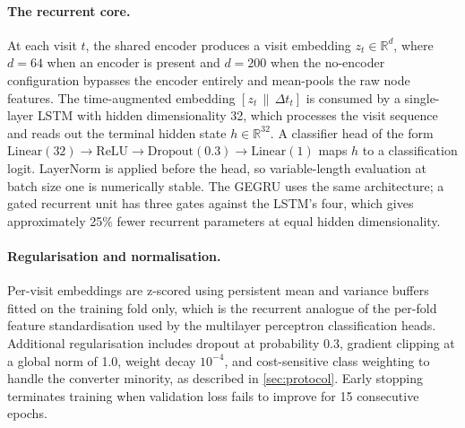 \paragraph{The recurrent core.}
At each visit $t$, the shared encoder produces a visit embedding $z_t \in \mathbb{R}^{d}$,
where $d = 64$ when an encoder is present and $d = 200$ when the no-encoder
configuration bypasses the encoder entirely and mean-pools the raw node features. The time-augmented
embedding $[z_t \,\|\, \Delta t_t]$ is consumed by a single-layer \ac{LSTM} with hidden
dimensionality 32, which processes the visit sequence and reads out the terminal hidden
state $h \in \mathbb{R}^{32}$. A classifier head of the form
$\text{Linear}(32) \to \text{ReLU} \to \text{Dropout}(0.3) \to \text{Linear}(1)$
maps $h$ to a classification logit. LayerNorm is applied before the head, so
variable-length evaluation at batch size one is numerically stable. The \ac{GEGRU} uses the
same architecture; a gated recurrent unit has three gates
against the \ac{LSTM}'s four, which gives approximately 25\% fewer recurrent parameters at
equal hidden dimensionality.

\paragraph{Regularisation and normalisation.}
Per-visit embeddings are z-scored using persistent mean and variance buffers fitted on the
training fold only, which is the recurrent analogue of the per-fold feature
standardisation used by the multilayer perceptron classification heads. Additional
regularisation includes dropout at probability 0.3, gradient clipping at a global norm of
1.0, weight decay $10^{-4}$, and cost-sensitive class weighting to handle the converter
minority, as described in \autoref{sec:protocol}. Early stopping terminates training when
validation loss fails to improve for 15 consecutive epochs.

